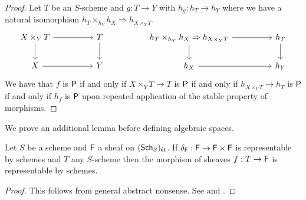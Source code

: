 \begin{proof}
    Let $T$ be an $S$-scheme and $g:T\to Y$ with $h_{g}:h_{T}\to h_{Y}$ where we have a natural isomorphism $h_{T}\times_{h_{Y}}h_{X}\Longrightarrow h_{X\times_{Y}T}$.
    $$%
    \begin{tikzcd}
        {X\times_{Y}T} && T && {h_{T}\times_{h_{Y}}h_{X}\Rightarrow h_{X\times_{Y}T}} && {h_{T}} \\
        X && Y && {h_{X}} && {h_{Y}}
        \arrow[from=2-1, to=2-3]
        \arrow[from=1-1, to=1-3]
        \arrow[from=1-3, to=2-3]
        \arrow[from=1-1, to=2-1]
        \arrow[from=2-5, to=2-7]
        \arrow[from=1-5, to=1-7]
        \arrow[from=1-5, to=2-5]
        \arrow[from=1-7, to=2-7]
    \end{tikzcd}$$
    We have that $f$ is $\mathsf{P}$ if and only if $X\times_{Y}T\to T$ is $\mathsf{P}$ if and only if $h_{X\times_{Y}T}\to h_{T}$ is $\mathsf{P}$ if and only if $h_{f}$ is $\mathsf{P}$ upon repeated application of the stable property of morphisms. 
\end{proof}
We prove an additional lemma before defining algebraic spaces.
\begin{lemma}\label{lem: rep diagonal then rep}
    Let $S$ be a scheme and $\mathsf{F}$ a sheaf on $(\mathsf{Sch}_{S})_{\mathsf{\acute{e}t}}$. If $\delta_{\mathsf{F}}:\mathsf{F}\to\mathsf{F}\times\mathsf{F}$ is representable by schemes and $T$ any $S$-scheme then the morphism of sheaves $f:T\to\mathsf{F}$ is representable by schemes. 
\end{lemma} 
\begin{proof}
    This follows from general abstract nonsense. See \cite[\href{https://stacks.math.columbia.edu/tag/0022}{Lemma 0022}]{stacks-project} and \cite[\href{https://stacks.math.columbia.edu/tag/0024}{Lemma 0024}]{stacks-project}. 
\end{proof}
\newpage
